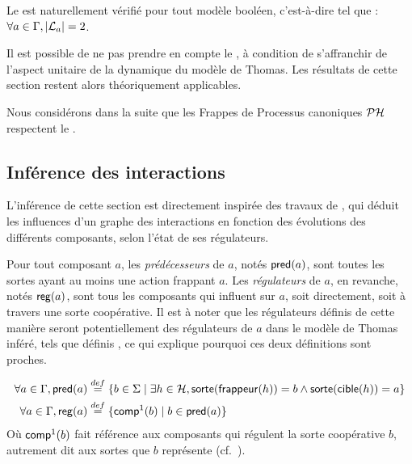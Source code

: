 \begin{remark}
  Le  est naturellement vérifié pour tout modèle booléen,
  c'est-à-dire tel que : $\forall a \in \mathrm{\Gamma}, |\mathcal{L}_a| = 2$.
\end{remark}

\begin{remark}
  Il est possible de ne pas prendre en compte le ,
  à condition de s'affranchir de l'aspect unitaire de la dynamique du modèle de Thomas.
  Les résultats de cette section restent alors théoriquement applicables.
\end{remark}

Nous considérons dans la suite que les Frappes de Processus canoniques $\mathcal{PH}$ respectent
le .



\subsection{Inférence des interactions}


L'inférence de cette section est directement inspirée des travaux de ,
qui déduit les influences d'un graphe des interactions en fonction des évolutions des différents
composants, selon l'état de ses régulateurs.

\newcommand{\myupsilon}{\upsilon}

Pour tout composant $a$,
les \emph{prédécesseurs} de $a$, notés $\mathsf{pred}(a)$,
sont toutes les sortes ayant au moins une action frappant $a$.
Les \emph{régulateurs} de $a$, en revanche, notés $\mathsf{reg}(a)$, sont tous les composants
qui influent sur $a$, soit directement, soit à travers une sorte coopérative.
Il est à noter que les régulateurs définis de cette manière seront potentiellement
des régulateurs de $a$ dans le modèle de Thomas inféré,
tels que définis ,
ce qui explique pourquoi ces deux définitions sont proches.

\begin{align*}
  \forall a \in \mathrm{\Gamma}, \mathsf{pred}(a) &\stackrel{def}= \{ b \in \Sigma \mid
    \exists h \in \mathcal{H}, \mathsf{sorte}(\mathsf{frappeur}(h)) = b \wedge
    \mathsf{sorte}(\mathsf{cible}(h)) = a \} \\
  \forall a \in \mathrm{\Gamma}, \mathsf{reg}(a) &\stackrel{def}= \{ \mathsf{comp}^1(b) \mid
    b \in \mathsf{pred}(a) \}
\end{align*}
Où $\mathsf{comp}^1(b)$ fait référence aux composants qui régulent la sorte coopérative $b$,
autrement dit aux sortes que $b$ représente
(cf.~).

